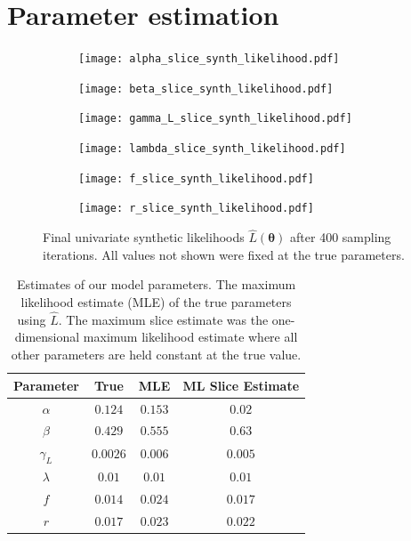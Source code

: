 \section{Parameter estimation}

\begin{figure}[htbp]
    \centering
    \begin{subfigure}[b]{0.5\textwidth}
        \centering
        \texttt{[image: alpha\_slice\_synth\_likelihood.pdf]}
    \end{subfigure}%
    \hfill%
    \begin{subfigure}[b]{0.5\textwidth}
        \centering
        \texttt{[image: beta\_slice\_synth\_likelihood.pdf]}
    \end{subfigure}
    \begin{subfigure}[b]{0.5\textwidth}
        \centering
        \texttt{[image: gamma\_L\_slice\_synth\_likelihood.pdf]}
    \end{subfigure}%
    \hfill%
    \begin{subfigure}[b]{0.5\textwidth}
        \centering
        \texttt{[image: lambda\_slice\_synth\_likelihood.pdf]}
    \end{subfigure}
    \begin{subfigure}[b]{0.5\textwidth}
        \centering
        \texttt{[image: f\_slice\_synth\_likelihood.pdf]}
    \end{subfigure}%
    \hfill%
    \begin{subfigure}[b]{0.5\textwidth}
        \centering
        \texttt{[image: r\_slice\_synth\_likelihood.pdf]}
    \end{subfigure}%
    \caption{
        Final univariate synthetic likelihoods $\hat{L}(\bm{\theta})$ after
        400 sampling iterations. All values not shown were fixed at the true
        parameters.
    }
    \label{fig:final_synth_lik}
\end{figure}

\begin{table}[htbp]
    \caption{
        Estimates of our model parameters.
        The maximum likelihood estimate (MLE) of the true parameters using
        $\hat{L}.$ The maximum slice estimate was the one-dimensional
        maximum likelihood estimate where all other parameters are held
        constant at the true value.
    }
    \label{tab:param_est}
    \centering
    \begin{tabular}{c | c | c | c}
        Parameter  & True     & MLE     & ML Slice Estimate \\
        \hline
        $\alpha$   & $0.124$  & $0.153$ & $0.02$            \\
        $\beta $   & $0.429$  & $0.555$ & $0.63$            \\
        $\gamma_L$ & $0.0026$ & $0.006$ & $0.005$           \\
        $\lambda$  & $0.01$   & $0.01$  & $0.01$            \\
        $f$        & $0.014$  & $0.024$ & $0.017$           \\
        $r$        & $0.017$  & $0.023$ & $0.022$           \\
    \end{tabular}
\end{table}

